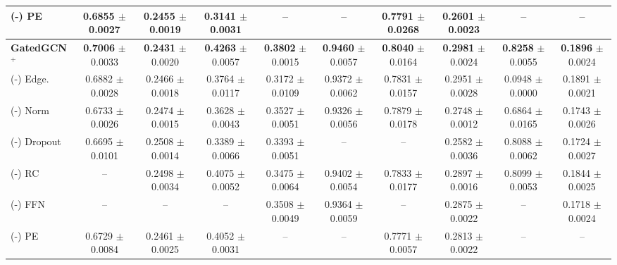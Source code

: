 \begin{table*}[t]
{\begin{tabular}{l|ccccccccc}
        (-) PE & 0.6855{\tiny{ $\pm$ 0.0027}} & 0.2455{\tiny{ $\pm$ 0.0019}} & 0.3141{\tiny{ $\pm$ 0.0031}} & – & – & 0.7791{\tiny{ $\pm$ 0.0268 }} & 0.2601{\tiny{ $\pm$ 0.0023}} & – & –  \\
        \midrule %
        \textbf{GatedGCN$^+$} & \textbf{0.7006}{\tiny{ $\pm$ 0.0033}} & \textbf{0.2431}{\tiny{ $\pm$ 0.0020}} & \textbf{0.4263}{\tiny{ $\pm$ 0.0057}} & \textbf{0.3802}{\tiny{ $\pm$ 0.0015}} & \textbf{0.9460}{\tiny{ $\pm$ 0.0057}} & \textbf{0.8040}{\tiny{ $\pm$ 0.0164}} & \textbf{0.2981}{\tiny{ $\pm$ 0.0024}} & \textbf{0.8258}{\tiny{ $\pm$ 0.0055}} & \textbf{0.1896}{\tiny{ $\pm$ 0.0024}}  \\ 
        (-) Edge. & 0.6882{\tiny{ $\pm$ 0.0028}} & 0.2466{\tiny{ $\pm$ 0.0018}} & 0.3764{\tiny{ $\pm$ 0.0117}} & 0.3172{\tiny{ $\pm$ 0.0109}} & 0.9372{\tiny{ $\pm$ 0.0062}} & 0.7831{\tiny{ $\pm$ 0.0157}} & 0.2951{\tiny{ $\pm$ 0.0028}} & 0.0948{\tiny{ $\pm$ 0.0000}} & 0.1891{\tiny{ $\pm$ 0.0021}} \\ 
        (-) Norm & 0.6733{\tiny{ $\pm$ 0.0026}} & 0.2474{\tiny{ $\pm$ 0.0015}} & 0.3628{\tiny{ $\pm$ 0.0043}} & 0.3527{\tiny{ $\pm$ 0.0051}} & 0.9326{\tiny{ $\pm$ 0.0056}} & 0.7879{\tiny{ $\pm$ 0.0178}} & 0.2748{\tiny{ $\pm$ 0.0012}} & 0.6864{\tiny{ $\pm$ 0.0165}} & 0.1743{\tiny{ $\pm$ 0.0026}} \\ 
        (-) Dropout & 0.6695{\tiny{ $\pm$ 0.0101}} & 0.2508{\tiny{ $\pm$ 0.0014}} & 0.3389{\tiny{ $\pm$ 0.0066}} & 0.3393{\tiny{ $\pm$ 0.0051}} & – & – & 0.2582{\tiny{ $\pm$ 0.0036}} & 0.8088{\tiny{ $\pm$ 0.0062}} & 0.1724{\tiny{ $\pm$ 0.0027}}  \\ 
        (-) RC & – & 0.2498{\tiny{ $\pm$ 0.0034}} & 0.4075{\tiny{ $\pm$ 0.0052}} & 0.3475{\tiny{ $\pm$ 0.0064}} & 0.9402{\tiny{ $\pm$ 0.0054}} & 0.7833{\tiny{ $\pm$ 0.0177}} & 0.2897{\tiny{ $\pm$ 0.0016}} & 0.8099{\tiny{ $\pm$ 0.0053}} & 0.1844{\tiny{ $\pm$ 0.0025}} \\ 
        (-) FFN & – & – & – & 0.3508{\tiny{ $\pm$ 0.0049}} & 0.9364{\tiny{ $\pm$ 0.0059}} & – & 0.2875{\tiny{ $\pm$ 0.0022}} & – & 0.1718{\tiny{ $\pm$ 0.0024}} \\ 
        (-) PE & 0.6729{\tiny{ $\pm$ 0.0084}} & 0.2461{\tiny{ $\pm$ 0.0025}} & 0.4052{\tiny{ $\pm$ 0.0031}} & – & – & 0.7771{\tiny{ $\pm$ 0.0057}} & 0.2813{\tiny{ $\pm$ 0.0022}} & – & – \\ 
        \bottomrule
    \end{tabular}
    }
    \label{tab:ab2}
\end{table*}

